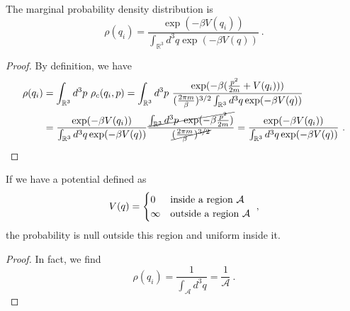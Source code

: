     The marginal probability density distribution is 
    \begin{equation*}
        \rho(q_i) = \frac{\exp (- \beta V(q_i) )}{\int_{\mathbb R^3} d^3 q \exp(- \beta V(q))} ~.
    \end{equation*}
    \begin{proof}
        By definition, we have
        \begin{equation*}
        \begin{aligned}
            \rho(q_i) & = \int_{\mathbb R^3} d^3 p ~ \rho_c (q_i, p) = \int_{\mathbb R^3} d^3 p ~ \frac{\exp (- \beta ( \frac{p^2}{2m} + V(q_i) ))}{(\frac{2\pi m}{\beta})^{3/2} \int_{\mathbb R^3} d^3 q \exp(- \beta V(q))} \\ & = \frac{\exp (- \beta V(q_i) )}{\int_{\mathbb R^3} d^3 q \exp(- \beta V(q))} \frac{\cancel{\int_{\mathbb R^3} d^3 p ~ \exp(- \beta \frac{p^2}{2m})}}{\cancel{(\frac{2\pi m}{\beta})^{3/2}}} = \frac{\exp (- \beta V(q_i) )}{\int_{\mathbb R^3} d^3 q \exp(- \beta V(q))} ~.
        \end{aligned}
        \end{equation*}
    \end{proof}

    If we have a potential defined as 
    \begin{equation*}
        V (q) = \begin{cases}
            0 & \textnormal{inside a region } \mathcal A\\
            \infty & \textnormal{outside a region } \mathcal A\\
        \end{cases} ~,
    \end{equation*}
    the probability is null outside this region and uniform inside it. 
    \begin{proof}
        In fact, we find
        \begin{equation*}
            \rho(q_i) = \frac{1}{\int_{\mathcal A} d^3 q} = \frac{1}{\mathcal A} ~. 
        \end{equation*}
    \end{proof}

